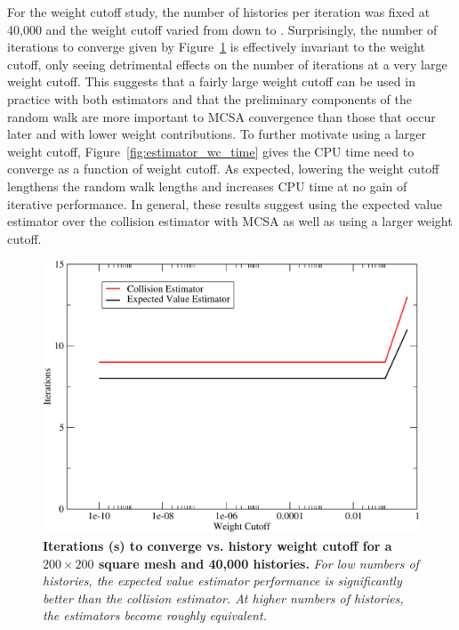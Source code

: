 For the weight cutoff study, the number of histories per iteration was
fixed at 40,000 and the weight cutoff varied from  down to
. Surprisingly, the number of iterations to converge given
by Figure~\ref{fig:estimator_wc_iters} is effectively invariant to the
weight cutoff, only seeing detrimental effects on the number of
iterations at a very large weight cutoff. This suggests that a fairly
large weight cutoff can be used in practice with both estimators and
that the preliminary components of the random walk are more important
to MCSA convergence than those that occur later and with lower weight
contributions. To further motivate using a larger weight cutoff,
Figure~\ref{fig:estimator_wc_time} gives the CPU time need to converge
as a function of weight cutoff. As expected, lowering the weight
cutoff lengthens the random walk lengths and increases CPU time at no
gain of iterative performance. In general, these results suggest using
the expected value estimator over the collision estimator with MCSA as
well as using a larger weight cutoff.

\begin{figure}[t!]
  \centering
  \includegraphics[width=6in,clip]{chapters/mc_background/estimator_wc_iters.pdf}
  \caption{\textbf{Iterations (s) to converge vs. history weight
      cutoff for a $200 \times 200$ square mesh and 40,000 histories.}
    \textit{For low numbers of histories, the expected value estimator
      performance is significantly better than the collision
      estimator. At higher numbers of histories, the estimators become
      roughly equivalent.}}
  \label{fig:estimator_wc_iters}
\end{figure}

